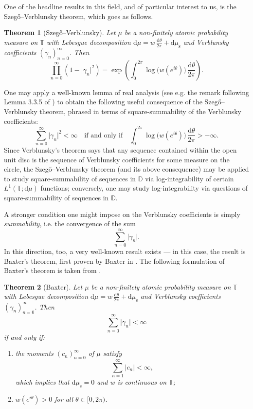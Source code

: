 \documentclass[11pt,reqno]{amsart}
\def\g{\gamma}
\def\th{\theta}
\def\rmd{\mathrm{d}}
\def\DD{\mathbb{D}}
\def\TT{\mathbb{T}}
\def\rms{\mathrm{s}}
\newtheorem{theorem}{Theorem}[section]
\theoremstyle{definition}
\numberwithin{equation}{section}
\begin{document}
One of the headline results in this field, and of particular interest to us, is the Szeg\H{o}--Verblunsky theorem, which goes as follows.
\begin{theorem}[Szeg\H{o}--Verblunsky]
    Let \(\mu\) be a non-finitely atomic probability measure on \(\TT\) with Lebesgue decomposition \(\rmd\mu = w \, \frac{\rmd\th}{2\pi} + \rmd\mu_\rms\) and Verblunsky coefficients \((\g_n)_{n=0}^{\infty}\). Then
    \[
        \prod_{n=0}^{\infty} (1 - \lvert \g_n \rvert^2) = \exp\left( \int_0^{2\pi} \log\big(w(e^{i\th})\big) \, \frac{\rmd\th}{2\pi}\right).
    \]
\end{theorem}
One may apply a well-known lemma of real analysis (see e.g. the remark following Lemma 3.3.5 of \cite{Kat04}) to obtain the following useful consequence of the Szeg\H{o}--Verblunsky theorem, phrased in terms of square-summability of the Verblunsky coefficients:
\[
    \sum_{n=0}^{\infty} \lvert \g_n \rvert^2 < \infty \quad \text{if and only if} \quad \int_0^{2\pi} \log \big(w(e^{i\th})\big) \, \frac{\rmd\th}{2\pi} > -\infty.
\]
Since Verblunsky's theorem \cite{Ver35a} says that any sequence contained within the open unit disc is the sequence of Verblunsky coefficients for some measure on the circle, the Szeg\H{o}--Verblunsky theorem (and its above consequence) may be applied to study square-summability of sequences in \(\DD\) via log-integrability of certain \(L^1(\TT; \rmd\mu)\) functions; conversely, one may study log-integrability via questions of square-summability of sequences in \(\DD\).

A stronger condition one might impose on the Verblunsky coefficients is simply \emph{summability}, i.e. the convergence of the sum
\[
    \sum_{n=0}^\infty \lvert \g_n \rvert.
\]
In this direction, too, a very well-known result exists --- in this case, the result is Baxter's theorem, first proven by Baxter in \cite{Bax61}. The following formulation of Baxter's theorem is taken from \cite{Sim05a}.
\begin{theorem}[Baxter]
    Let \(\mu\) be a non-finitely atomic probability measure on \(\TT\) with Lebesgue decomposition \(\rmd\mu = w \, \frac{\rmd\th}{2\pi} + \rmd\mu_\rms\) and Verblunsky coefficients \((\g_n)_{n=0}^{\infty}\). Then
    \[
        \sum_{n=0}^\infty \lvert \g_n \rvert < \infty
    \]
    if and only if:
    \begin{enumerate}[label={\upshape\roman*)}]
        \item the moments \((c_n)_{n=0}^{\infty}\) of \(\mu\) satisfy
        \[
            \sum_{n=1}^{\infty} \lvert c_n \rvert < \infty,
        \]
        which implies that \(\rmd\mu_\rms = 0\) and \(w\) is continuous on \(\TT\);
        \item \(w(e^{i\th}) > 0\) for all \(\th \in [0,2\pi)\).
    \end{enumerate}
\end{theorem}
\end{document}
